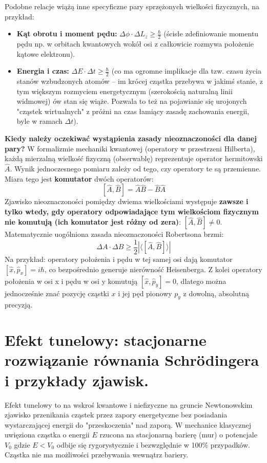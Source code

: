 \documentclass[11pt, a4paper]{article}
\begin{document}
Podobne relacje wiążą inne specyficzne pary sprzężonych wielkości fizycznych, na przykład:
\begin{itemize}
    \item \textbf{Kąt obrotu i moment pędu:} $\Delta \phi \cdot \Delta L_z \ge \frac{\hbar}{2}$ (ścisłe zdefiniowanie momentu pędu np. w orbitach kwantowych wokół osi z całkowicie rozmywa położenie kątowe elektronu).
    \item \textbf{Energia i czas:} $\Delta E \cdot \Delta t \ge \frac{\hbar}{2}$ (co ma ogromne implikacje dla tzw. czasu życia stanów wzbudzonych atomów – im krócej cząstka przebywa w jakimś stanie, z tym większym rozmyciem energetycznym (szerokością naturalną linii widmowej) ów stan się wiąże. Pozwala to też na pojawianie się urojonych "cząstek wirtualnych" z próżni na czas łamiący zasadę zachowania energii, byle w ramach $\Delta t$).
\end{itemize}

\textbf{Kiedy należy oczekiwać wystąpienia zasady nieoznaczoności dla danej pary?}
W formalizmie mechaniki kwantowej (operatory w przestrzeni Hilberta), każdą mierzalną wielkość fizyczną (obserwablę) reprezentuje operator hermitowski $\hat{A}$. Wynik jednoczesnego pomiaru zależy od tego, czy operatory te są przemienne. Miara tego jest \textbf{komutator} dwóch operatorów:
\[
[\hat{A}, \hat{B}] = \hat{A}\hat{B} - \hat{B}\hat{A}
\]
Zjawisko nieoznaczoności pomiędzy dwiema wielkościami występuje \textbf{zawsze i tylko wtedy, gdy operatory odpowiadające tym wielkościom fizycznym nie komutują (ich komutator jest różny od zera)}: $[\hat{A}, \hat{B}] \neq 0$. 
Matematycznie uogólniona zasada nieoznaczoności Robertsona brzmi:
\[
\Delta A \cdot \Delta B \ge \frac{1}{2} \left| \langle [\hat{A}, \hat{B}] \rangle \right|
\]
Na przykład: operatory położenia i pędu w tej samej osi dają komutator $[\hat{x}, \hat{p}_x] = i\hbar$, co bezpośrednio generuje nierówność Heisenberga. Z kolei operatory położenia w osi x i pędu w osi y komutują $[\hat{x}, \hat{p}_y] = 0$, dlatego można jednocześnie znać pozycję cząstki $x$ i jej pęd pionowy $p_y$ z dowolną, absolutną precyzją.

\section{Efekt tunelowy: stacjonarne rozwiązanie równania Schrödingera i przykłady zjawisk.}

Efekt tunelowy to na wskroś kwantowe i niefizyczne na gruncie Newtonowskim zjawisko przenikania cząstek przez zapory energetyczne bez posiadania wystarczającej energii do "przeskoczenia" nad zaporą.
W mechanice klasycznej uwięziona cząstka o energii $E$ rzucona na stacjonarną barierę (mur) o potencjale $V_0$ gdzie $E < V_0$ odbije się rygorystycznie i bezwzględnie w 100\% przypadków. Cząstka nie ma możliwości przebywania wewnątrz bariery.
\end{document}
